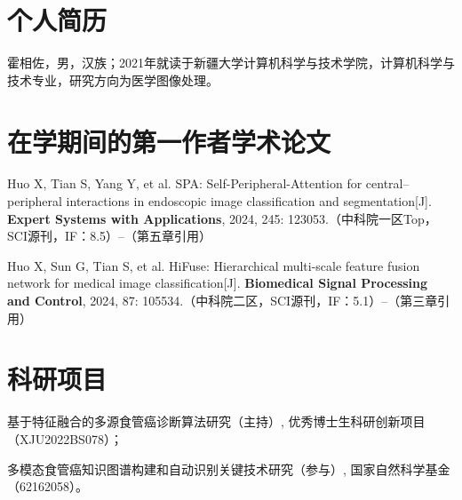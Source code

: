 
\begin{resume}

  \section*{个人简历}

霍相佐，男，汉族；2021年就读于新疆大学计算机科学与技术学院，计算机科学与技术专业，研究方向为医学图像处理。


  \section*{在学期间的第一作者学术论文}

  \begin{achievements}
    \item Huo X, Tian S, Yang Y, et al. SPA: Self-Peripheral-Attention for central–peripheral interactions in endoscopic image classification and segmentation[J]. \textbf{Expert Systems with Applications}, 2024, 245: 123053.（中科院一区Top，SCI源刊，IF：8.5）--（第五章引用）
    \item Huo X, Sun G, Tian S, et al. HiFuse: Hierarchical multi-scale feature fusion network for medical image classification[J]. \textbf{Biomedical Signal Processing and Control}, 2024, 87: 105534.（中科院二区，SCI源刊，IF：5.1）--（第三章引用）

  \end{achievements}


  \section*{科研项目}
    
基于特征融合的多源食管癌诊断算法研究（主持）, 优秀博士生科研创新项目（XJU2022BS078）；

多模态食管癌知识图谱构建和自动识别关键技术研究（参与）, 国家自然科学基金（62162058）。


\end{resume}
